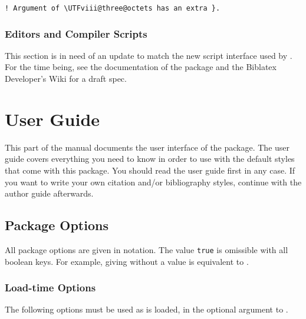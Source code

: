 \documentclass{ltxdockit}[2011/03/25]
\begin{document}
\begin{verbatim}
! Argument of \UTFviii@three@octets has an extra }.
\end{verbatim}

\subsubsection{Editors and Compiler Scripts}
\label{bib:cav:ide}

This section is in need of an update to match the new script interface used by . For the time being, see the documentation of the  package and the Biblatex Developer's Wiki for a draft spec.


\section{User Guide}
\label{use}

This part of the manual documents the user interface of the  package. The user guide covers everything you need to know in order to use  with the default styles that come with this package. You should read the user guide first in any case. If you want to write your own citation and\slash or bibliography styles, continue with the author guide afterwards.

\subsection{Package Options}
\label{use:opt}

All package options are given in \keyval notation. The value \texttt{true} is omissible with all boolean keys. For example, giving  without a value is equivalent to .

\subsubsection{Load-time Options}
\label{use:opt:ldt}

The following options must be used as  is loaded, \ie in the optional argument to .
\end{document}
